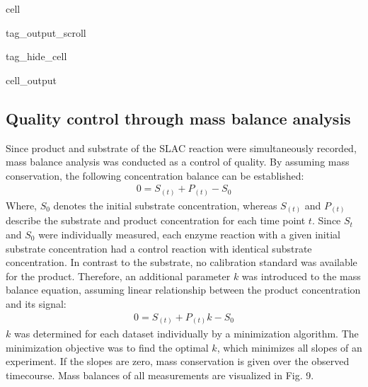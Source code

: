 \documentclass[letterpaper,12pt,english]{jupyterBook}
\begin{document}
\begin{sphinxuseclass}{cell}
\begin{sphinxuseclass}{tag_output_scroll}
\begin{sphinxuseclass}{tag_hide_cell}
\begin{sphinxVerbatimOutput}
\begin{sphinxuseclass}{cell_output}
\end{sphinxuseclass}\end{sphinxVerbatimOutput}

\end{sphinxuseclass}
\end{sphinxuseclass}
\end{sphinxuseclass}

\subsection{Quality control through mass balance analysis}
\label{\detokenize{scenarios/SLAC_kinetic_characterization:quality-control-through-mass-balance-analysis}}
\sphinxAtStartPar
Since product and substrate of the SLAC reaction were simultaneously recorded, mass balance analysis was conducted as a control of quality. By assuming mass conservation, the following concentration balance can be established:
\begin{equation}\label{equation:scenarios/SLAC_kinetic_characterization:mass_balance}
\begin{split}0 = S_{(t)} + P_{(t)} - S_{0}\end{split}
\end{equation}
\sphinxAtStartPar
Where, \(S_{0}\) denotes the initial substrate concentration, whereas \(S_{(t)}\) and \(P_{(t)}\) describe the substrate and product concentration for each time point \(t\). Since \(S_{t}\) and \(S_{0}\) were individually measured, each enzyme reaction with a given initial substrate concentration had a control reaction with identical substrate concentration. In contrast to the substrate, no calibration standard was available for the product. Therefore, an additional parameter \(k\) was introduced to the mass balance equation, assuming linear relationship between the product concentration and its signal:
\begin{equation}\label{equation:scenarios/SLAC_kinetic_characterization:mass_balance_with_k}
\begin{split}0 = S_{(t)} + P_{(t)}k - S_{0}\end{split}
\end{equation}
\sphinxAtStartPar
\(k\) was determined for each dataset individually by a minimization algorithm. The minimization objective was to find the optimal \(k\), which minimizes all slopes of an experiment. If the slopes are zero, mass conservation is given over the observed time\sphinxhyphen{}course. Mass balances of all measurements are visualized in Fig. 9.
\end{document}
